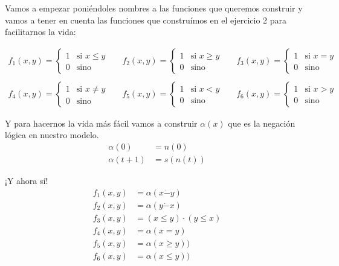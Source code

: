 \documentclass[fleqn, 11pt]{article}
\begin{document}
Vamos a empezar poniéndoles nombres a las funciones que queremos construir y
vamos a tener en cuenta las funciones que construímos en el ejercicio 2 para
facilitarnos la vida:

\begin{align*}
	f_1(x, y)=
	\begin{cases}
		1 & \text{si } x\leq y \\
		0 & \text{sino}
	\end{cases} &&
	f_2(x, y)=
	\begin{cases}
		1 & \text{si } x\geq y \\
		0 & \text{sino}
	\end{cases} &&
	f_3(x, y)=
	\begin{cases}
		1 & \text{si } x=y \\
		0 & \text{sino}
	\end{cases} \\ \\
	f_4(x, y)=
	\begin{cases}
		1 & \text{si } x\neq y \\
		0 & \text{sino}
	\end{cases} &&
	f_5(x, y)=
	\begin{cases}
		1 & \text{si } x<y \\
		0 & \text{sino}
	\end{cases} &&
	f_6(x, y)=
	\begin{cases}
		1 & \text{si } x>y \\
		0 & \text{sino}
	\end{cases}
\end{align*}

Y para hacernos la vida más fácil vamos a construir $\alpha(x)$ que es la
negación lógica en nuestro modelo.
\begin{align*}
	\alpha(0)     &= n(0) \\
	\alpha(t + 1) &= s(n(t))
\end{align*}

¡Y ahora sí!
\begin{align*}
	f_1(x, y) &= \alpha(x\dot-y) \\
	f_2(x, y) &= \alpha(y\dot-x) \\
	f_3(x, y) &= (x \leq y) \cdot (y \leq x) \\
	f_4(x, y) &= \alpha(x = y) \\
	f_5(x, y) &= \alpha(x \geq y)) \\
	f_6(x, y) &= \alpha(x \leq y))
\end{align*}
\end{document}
